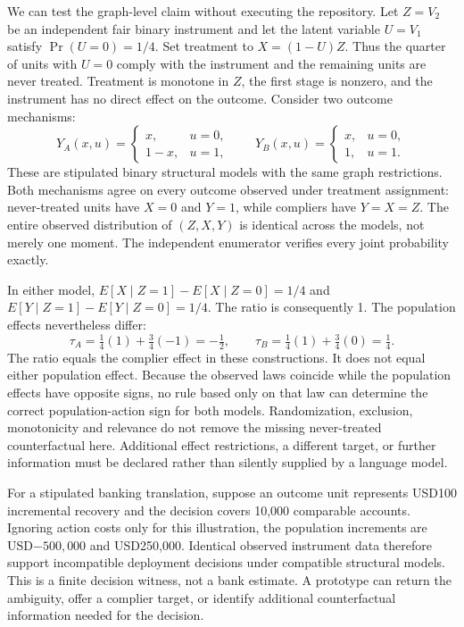 We can test the graph-level claim without executing the repository. Let $Z=V_2$ be an independent fair binary instrument and let the latent variable $U=V_1$ satisfy $\Pr(U=0)=1/4$. Set treatment to $X=(1-U)Z$. Thus the quarter of units with $U=0$ comply with the instrument and the remaining units are never treated. Treatment is monotone in $Z$, the first stage is nonzero, and the instrument has no direct effect on the outcome. Consider two outcome mechanisms:
\[
Y_A(x,u)=\begin{cases}x,&u=0,\\1-x,&u=1,\end{cases}
\qquad
Y_B(x,u)=\begin{cases}x,&u=0,\\1,&u=1.\end{cases}
\]
These are stipulated binary structural models with the same graph restrictions. Both mechanisms agree on every outcome observed under treatment assignment: never-treated units have $X=0$ and $Y=1$, while compliers have $Y=X=Z$. The entire observed distribution of $(Z,X,Y)$ is identical across the models, not merely one moment. The independent enumerator verifies every joint probability exactly.~\citep{exec25_bor_reference}

In either model, $E[X\mid Z=1]-E[X\mid Z=0]=1/4$ and $E[Y\mid Z=1]-E[Y\mid Z=0]=1/4$. The ratio is consequently 1. The population effects nevertheless differ:
\[
\tau_A=\tfrac14(1)+\tfrac34(-1)=-\tfrac12,
\qquad
\tau_B=\tfrac14(1)+\tfrac34(0)=\tfrac14.
\]
The ratio equals the complier effect in these constructions. It does not equal either population effect. Because the observed laws coincide while the population effects have opposite signs, no rule based only on that law can determine the correct population-action sign for both models. Randomization, exclusion, monotonicity and relevance do not remove the missing never-treated counterfactual here. Additional effect restrictions, a different target, or further information must be declared rather than silently supplied by a language model.~\citep{exec25_bor_reference}

For a stipulated banking translation, suppose an outcome unit represents USD100 incremental recovery and the decision covers 10,000 comparable accounts. Ignoring action costs only for this illustration, the population increments are USD$-500{,}000$ and USD250,000. Identical observed instrument data therefore support incompatible deployment decisions under compatible structural models. This is a finite decision witness, not a bank estimate. A prototype can return the ambiguity, offer a complier target, or identify additional counterfactual information needed for the decision.~\citep{exec25_bor_reference}

